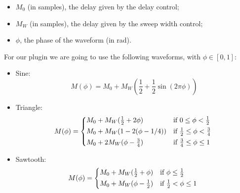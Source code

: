 \documentclass[a4paper,12pt]{report}
\begin{document}
\begin{itemize}
\item[\textperiodcentered] $M_{0}$ (in samples), the delay given by the delay control;
\item[\textperiodcentered] $M_{W}$ (in samples), the delay given by the sweep width control; 
\item[\textperiodcentered] $\phi$, the phase of the waveform (in rad).
\end{itemize}
For our plugin we are going to use the following waveforms, with $\phi \in [0,1]$:
\begin{itemize}
\item[\textperiodcentered] Sine: \[ M(\phi) = M_{0}+M_{W}(\frac{1}{2}+\frac{1}{2}\sin(2\pi \phi))\] 
\item[\textperiodcentered] Triangle:
  \begin{equation}
    M(\phi) =
    \begin{cases*}
      M_{0} + M_{W}(\frac{1}{2}+2\phi) & if $0\leq \phi<\frac{1}{2}$ \\
      M_{0} + M_{W}(1-2(\phi-1/4)) & if $\frac{1}{2}\leq \phi<\frac{3}{4}$ \\
      M_{0} + 2M_{W}(\phi-\frac{3}{4}) & if $\frac{3}{4}\leq \phi\leq 1$
    \end{cases*}
\end{equation}
\item[\textperiodcentered] Sawtooth:
  \begin{equation}
    M(\phi) =
    \begin{cases*}
      M_{0} + M_{W}(\frac{1}{2}+\phi) & if $\phi\leq \frac{1}{2}$\\
      M_{0} + M_{W}(\phi-\frac{1}{2}) & if $\frac{1}{2}<\phi\leq 1$
    \end{cases*}
\end{equation}
\end{itemize}
\end{document}
